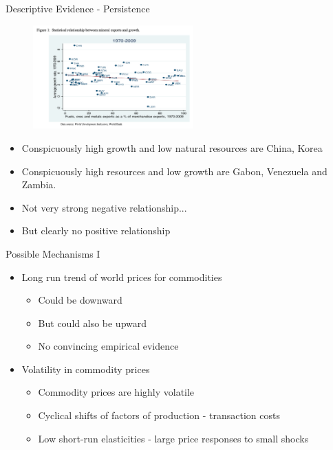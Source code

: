 \documentclass[11pt,notes=hide,aspectratio=169,mathserif]{beamer}
\begin{document}
\begin{frame}{Descriptive Evidence - Persistence}
\begin{figure}
\centering
\includegraphics[width=0.55\textwidth]{../TA9/inputs/fig2.png}
\end{figure}
\begin{itemize}
\item Conspicuously high growth and low natural resources are China, Korea
\pause \item Conspicuously high resources and low growth are Gabon, Venezuela and Zambia. 
\pause \item Not very strong negative relationship...
\pause \item But clearly no positive relationship
\end{itemize}
\end{frame}


\begin{frame}{Possible Mechanisms I}

\begin{itemize}
\item Long run trend of world prices for commodities
\begin{itemize}
    \pause \item Could be downward
    \pause \item But could also be upward 
    \pause \item No convincing empirical evidence
\end{itemize}
\item Volatility in commodity prices 
\begin{itemize}
    \pause \item Commodity prices are highly volatile
    \pause \item Cyclical shifts of factors of production - transaction costs 
    \pause \item Low short-run elasticities - large price responses to small shocks
\end{itemize}
\end{itemize}
\end{frame}
\end{document}
